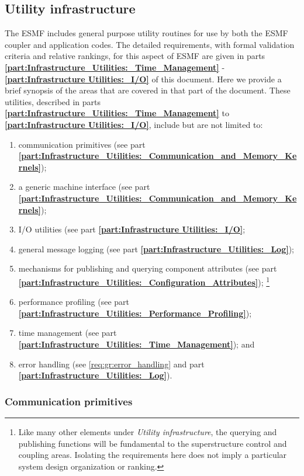 \subsection{Utility infrastructure}
The ESMF includes general purpose utility routines for use by both 
the ESMF coupler and application codes.
The detailed requirements, with formal validation criteria
and relative rankings, for this aspect of ESMF are given
in parts {\bf \ref{part:Infrastructure_Utilities:_Time_Management}} -
 {\bf \ref{part:Infrastructure Utilities:_I/O}} of this document.
Here we provide a brief synopsis of the areas that are covered
in that part of the document.
These utilities, described in parts {\bf \ref{part:Infrastructure_Utilities:_Time_Management}} to 
{\bf \ref{part:Infrastructure Utilities:_I/O}},
include but are not limited to:
\begin{enumerate}
\item communication primitives (see part {\bf \ref{part:Infrastructure_Utilities:_Communication_and_Memory_Kernels}});
\item a generic machine interface (see part {\bf \ref{part:Infrastructure_Utilities:_Communication_and_Memory_Kernels}});
\item I/O utilities (see part {\bf \ref{part:Infrastructure Utilities:_I/O}};
\item general message logging (see part {\bf \ref{part:Infrastructure_Utilities:_Log}});
\item mechanisms for publishing and querying component attributes (see part {\bf \ref{part:Infrastructure_Utilities:_Configuration_Attributes}});
\footnote{Like many other elements under
{\it Utility infrastructure}, the querying and publishing functions will be 
fundamental to the superstructure control and coupling areas. Isolating the
requirements here does not imply a particular system design organization
or ranking.
}
\item performance profiling (see part {\bf \ref{part:Infrastructure_Utilities:_Performance_Profiling}});
\item time management (see part {\bf \ref{part:Infrastructure_Utilities:_Time_Management}}); and
\item error handling (see \ref{req:gr:error_handling} and part {\bf \ref{part:Infrastructure_Utilities:_Log}}).
\end{enumerate}

\subsubsection{Communication primitives}

